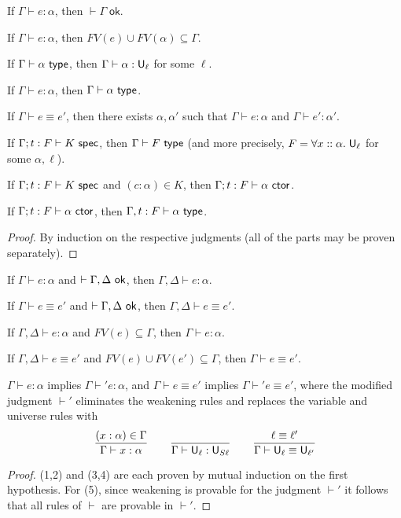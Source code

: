 \begin{lemma}[Regularity]\label{thm:reg}
\begin{thmlist}
\item If $\Gamma\vdash e:\alpha$, then $\vdash\Gamma\;\mathsf{ok}$.
\item If $\Gamma\vdash e:\alpha$, then $FV(e)\cup FV(\alpha)\subseteq\Gamma$.
\item If $\Gamma\vdash\alpha\type$, then $\Gamma\vdash\alpha:\U_\ell$ for some $\ell$.
\item If $\Gamma\vdash e:\alpha$, then $\Gamma\vdash\alpha\type$.
\item\label{item:defeq_reg2} If $\Gamma\vdash e\equiv e'$, then there exists $\alpha,\alpha'$ such that $\Gamma\vdash e:\alpha$ and $\Gamma\vdash e':\alpha'$.
\item If $\Gamma;t:F\vdash K\spec$, then $\Gamma\vdash F\type$ (and more precisely, $F=\forall x::\alpha.\;\mathsf{U}_\ell$ for some $\alpha,\ell$).
\item If $\Gamma;t:F\vdash K\spec$ and $(c:\alpha)\in K$, then $\Gamma;t:F\vdash\alpha\ctor$.
\item If $\Gamma;t:F\vdash \alpha\ctor$, then $\Gamma,t:F\vdash\alpha\type$.
\end{thmlist}
\end{lemma}
\begin{proof}
By induction on the respective judgments (all of the parts may be proven separately).
\end{proof}

\begin{lemma}[Weakening]\label{thm:weak}
\begin{thmlist}
\item If $\Gamma\vdash e:\alpha$ and $\vdash\Gamma,\Delta\ok$, then $\Gamma,\Delta\vdash e:\alpha$.
\item If $\Gamma\vdash e\equiv e'$ and $\vdash\Gamma,\Delta\ok$, then $\Gamma,\Delta\vdash e\equiv e'$.
\item If $\Gamma,\Delta\vdash e:\alpha$ and $FV(e)\subseteq\Gamma$, then $\Gamma\vdash e:\alpha$.
\item If $\Gamma,\Delta\vdash e\equiv e'$ and $FV(e)\cup FV(e')\subseteq\Gamma$, then $\Gamma\vdash e\equiv e'$.
\item $\Gamma\vdash e:\alpha$ implies $\Gamma\vdash' e:\alpha$, and $\Gamma\vdash e\equiv e'$ implies $\Gamma\vdash' e\equiv e'$, where the modified judgment $\vdash'$ eliminates the weakening rules and replaces the variable and universe rules with
$$\frac{(x:\alpha)\in\Gamma}{\Gamma\vdash x:\alpha}\qquad\frac{}{\Gamma\vdash \U_\ell:\U_{S\ell}}\qquad\frac{\ell\equiv\ell'}{\Gamma\vdash \U_\ell\equiv\U_{\ell'}}$$
\end{thmlist}
\end{lemma}
\begin{proof}
(1,2) and (3,4) are each proven by mutual induction on the first hypothesis. For (5), since weakening is provable for the judgment $\vdash'$ it follows that all rules of $\vdash$ are provable in $\vdash'$.
\end{proof}

